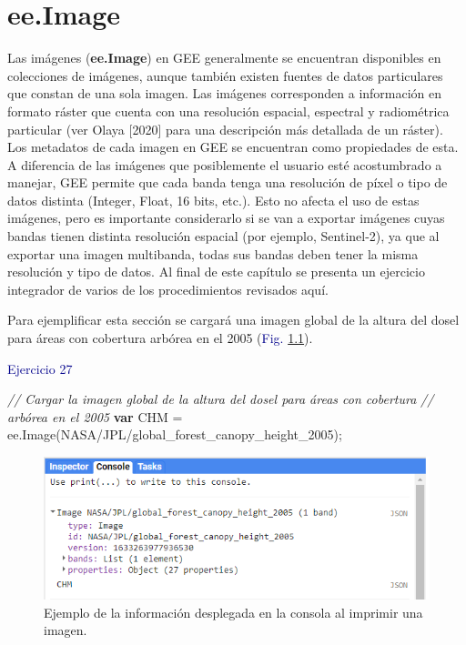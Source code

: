 \documentclass[
  12pt,
  letterpaper,
  twoside]{book}
\newenvironment{Shaded}{\begin{snugshade}}{\end{snugshade}}
\newcommand{\CommentTok}[1]{\textcolor[rgb]{0.24,0.58,0.00}{\textit{#1}}}
\newcommand{\ControlFlowTok}[1]{\textcolor[rgb]{0.00,0.00,0.00}{\textbf{#1}}}
\newcommand{\FunctionTok}[1]{\textcolor[rgb]{0.48,0.12,0.64}{#1}}
\newcommand{\KeywordTok}[1]{\textcolor[rgb]{0.48,0.12,0.64}{#1}}
\newcommand{\NormalTok}[1]{#1}
\newcommand{\OperatorTok}[1]{\textcolor[rgb]{0.00,0.00,0.00}{#1}}
\newcommand{\StringTok}[1]{\textcolor[rgb]{0.87,0.29,0.22}{#1}}
\newcommand\boldpurple[1]{\textcolor{darkpurple}{\textbf{#1}}}
\begin{document}
\newpage

\hypertarget{ee.image-1}{%
\chapter{ee.Image}\label{ee.image-1}}

Las imágenes (\boldpurple{ee.Image}) en GEE generalmente se encuentran disponibles en colecciones de imágenes, aunque también existen fuentes de datos particulares que constan de una sola imagen. Las imágenes corresponden a información en formato ráster que cuenta con una resolución espacial, espectral y radiométrica particular (ver Olaya {[}2020{]} para una descripción más detallada de un ráster).
Los metadatos de cada imagen en GEE se encuentran como propiedades de esta. A diferencia de las imágenes que posiblemente el usuario esté acostumbrado a manejar, GEE permite que cada banda tenga una resolución de píxel o tipo de datos distinta (Integer, Float, 16 bits, etc.). Esto no afecta el uso de estas imágenes, pero es importante considerarlo si se van a exportar imágenes cuyas bandas tienen distinta resolución espacial (por ejemplo, Sentinel-2), ya que al exportar una imagen multibanda, todas sus bandas deben tener la misma resolución y tipo de datos. Al final de este capítulo se presenta un ejercicio integrador de varios de los procedimientos revisados aquí.

Para ejemplificar esta sección se cargará una imagen global de la altura del dosel para áreas con cobertura arbórea en el 2005 (\textcolor{darkblue}{Fig.} \ref{fig:f91}).

\textcolor{darkblue}{Ejercicio 27}

\begin{Shaded}
\begin{Highlighting}[]
\CommentTok{// Cargar la imagen global de la altura del dosel para áreas con cobertura }
\CommentTok{// arbórea en el 2005}
\ControlFlowTok{var}\NormalTok{ CHM }\OperatorTok{=} \KeywordTok{ee}\OperatorTok{.}\FunctionTok{Image}\NormalTok{(}\StringTok{\textquotesingle{}NASA/JPL/global\_forest\_canopy\_height\_2005\textquotesingle{}}\NormalTok{)}\OperatorTok{;}
\end{Highlighting}
\end{Shaded}

\begin{figure}[H]

{\centering \includegraphics[width=0.95\linewidth]{Img/ej271} 

}

\caption{Ejemplo de la  información desplegada en la consola al imprimir una imagen.}\label{fig:f91}
\end{figure}
\end{document}
